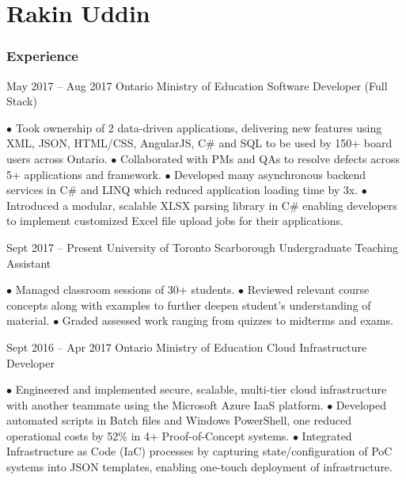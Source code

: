 \documentclass[fontsize=10pt]{tccv}
\begin{document}
	
	\part{Rakin Uddin}
	
	\section{Experience}
	
	\begin{eventlist}
		
		\item{May 2017 -- Aug 2017}
		{Ontario Ministry of Education}
		{Software Developer (Full Stack)}
		
		$\bullet$ Took ownership of 2 data-driven applications, delivering new features using XML, JSON, HTML/CSS, AngularJS, C\# and SQL to be used by 150+ board users across Ontario.\newline
		$\bullet$ Collaborated with PMs and QAs to resolve defects across 5+ applications and framework.\newline
		$\bullet$ Developed many asynchronous backend services in C\# and LINQ which reduced application loading time by 3x.\newline
		$\bullet$ Introduced a modular, scalable XLSX parsing library in C\# enabling developers to implement customized Excel file upload jobs for their applications.
		
		\item{Sept 2017 -- Present}
		{University of Toronto Scarborough}
		{Undergraduate Teaching Assistant}
		
		$\bullet$ Managed classroom sessions of 30+ students.\newline
		$\bullet$ Reviewed relevant course concepts along with examples to further deepen student’s understanding of material.\newline
		$\bullet$ Graded assessed work ranging from quizzes to midterms and exams.
		
		\item{Sept 2016 -- Apr 2017}
		{Ontario Ministry of Education}
		{Cloud Infrastructure Developer}
		
		$\bullet$ Engineered and implemented secure, scalable, multi-tier cloud infrastructure with another teammate using the Microsoft Azure IaaS platform.\newline
		$\bullet$ Developed automated scripts in Batch files and Windows PowerShell, one reduced operational costs by 52\% in 4+ Proof-of-Concept systems.\newline
		$\bullet$ Integrated Infrastructure as Code (IaC) processes by capturing state/configuration of PoC systems into JSON templates, enabling one-touch deployment of infrastructure.
		

\end{eventlist}
\end{document}
